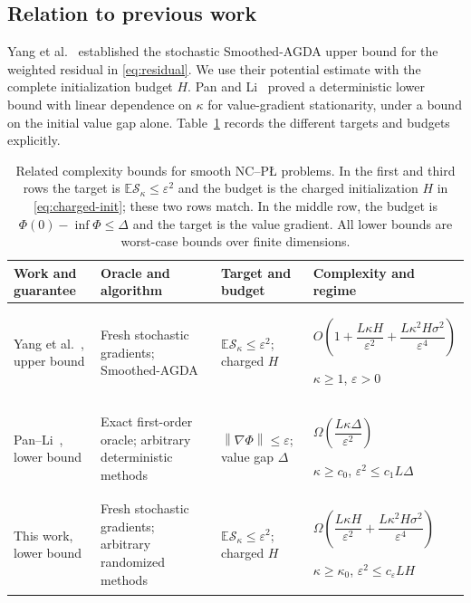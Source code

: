 \documentclass[11pt,a4paper]{article}
\newcommand{\E}{\mathbb E}
\newcommand{\eps}{\varepsilon}
\newcommand{\norm}[1]{\left\lVert #1\right\rVert}
\newcommand{\res}{\mathcal S_\kappa}
\theoremstyle{definition}
\theoremstyle{remark}
\numberwithin{equation}{section}
\begin{document}
\subsection{Relation to previous work}
\label{sec:related}

Yang et al.~\cite{yang} established the stochastic Smoothed-AGDA upper
bound for the weighted residual in \eqref{eq:residual}. We use their
potential estimate with the complete initialization budget $H$.
Pan and Li~\cite{panli} proved a deterministic lower bound with linear
dependence on $\kappa$ for value-gradient stationarity, under a bound on
the initial value gap alone. Table~\ref{tab:comparison} records the
different targets and budgets explicitly.

\begin{table}[t]
\centering
\caption{Related complexity bounds for smooth NC--P\L{} problems.
In the first and third rows the target is $\E\res\le\eps^2$ and the
budget is the charged initialization $H$ in \eqref{eq:charged-init};
these two rows match. In the middle row,
the budget is $\Phi(0)-\inf\Phi\le\Delta$ and the target is the value gradient.
All lower bounds are worst-case bounds over finite dimensions.}
\label{tab:comparison}
\small
\renewcommand{\arraystretch}{1.18}
\begin{tabularx}{\textwidth}{@{}>{\raggedright\arraybackslash}p{}
 >{\raggedright\arraybackslash}p{}
 >{\raggedright\arraybackslash}p{}
 >{\raggedright\arraybackslash}X@{}}
\toprule
Work and guarantee & Oracle and algorithm & Target and budget & Complexity and regime\\
\midrule
Yang et al.~\cite{yang}, upper bound & Fresh stochastic gradients;
Smoothed-AGDA & $\E\res\le\eps^2$; charged $H$
 & $O\!\left(1+\dfrac{L\kappa H}{\eps^2}
 +\dfrac{L\kappa^2H\sigma^2}{\eps^4}\right)$\par
 $\kappa\ge1$, $\eps>0$ \\
\addlinespace[4pt]
Pan--Li~\cite{panli}, lower bound & Exact first-order oracle;
arbitrary deterministic methods & $\norm{\nabla\Phi}\le\eps$; value gap $\Delta$
 & $\Omega\!\left(\dfrac{L\kappa\Delta}{\eps^2}\right)$\par
 $\kappa\ge c_0$, $\eps^2\le c_1L\Delta$ \\
\addlinespace[4pt]
This work, lower bound & Fresh stochastic gradients;
arbitrary randomized methods & $\E\res\le\eps^2$; charged $H$
 & $\Omega\!\left(\dfrac{L\kappa H}{\eps^2}
 +\dfrac{L\kappa^2H\sigma^2}{\eps^4}\right)$\par
 $\kappa\ge\kappa_0$, $\eps^2\le c_\eps LH$ \\
\bottomrule
\end{tabularx}
\end{table}
\end{document}
